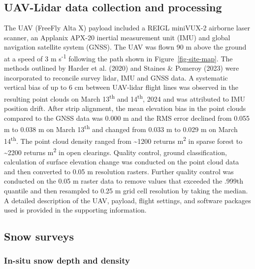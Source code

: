 \documentclass[
  letterpaper,
  DIV=11,
  numbers=noendperiod]{scrartcl}
\begin{document}
\subsection{UAV-Lidar data collection and
processing}\label{uav-lidar-data-collection-and-processing}

The UAV (FreeFly Alta X) payload included a REIGL miniVUX-2 airborne
laser scanner, an Applanix APX-20 inertial measurement unit (IMU) and
global navigation satellite system (GNSS). The UAV was flown 90 m above
the ground at a speed of 3 m s\textsuperscript{-1} following the path
shown in Figure~\ref{fig-site-map}. The methods outlined by Harder et
al. (2020) and Staines \& Pomeroy (2023) were incorporated to reconcile
survey lidar, IMU and GNSS data. A systematic vertical bias of up to 6
cm between UAV-lidar flight lines was observed in the resulting point
clouds on March 13\textsuperscript{th} and 14\textsuperscript{th}, 2024
and was attributed to IMU position drift. After strip alignment, the
mean elevation bias in the point clouds compared to the GNSS data was
0.000 m and the RMS error declined from 0.055 m to 0.038 m on March
13\textsuperscript{th} and changed from 0.033 m to 0.029 m on March
14\textsuperscript{th}. The point cloud density ranged from
\textasciitilde1200 returns m\textsuperscript{2} in sparse forest to
\textasciitilde2200 returns m\textsuperscript{2} in open clearings.
Quality control, ground classification, calculation of surface elevation
change was conducted on the point cloud data and then converted to 0.05
m resolution rasters. Further quality control was conducted on the 0.05
m raster data to remove values that exceeded the .999th quantile and
then resampled to 0.25 m grid cell resolution by taking the median. A
detailed description of the UAV, payload, flight settings, and software
packages used is provided in the supporting information.

\subsection{Snow surveys}\label{snow-surveys}

\subsubsection{In-situ snow depth and
density}\label{in-situ-snow-depth-and-density}
\end{document}
